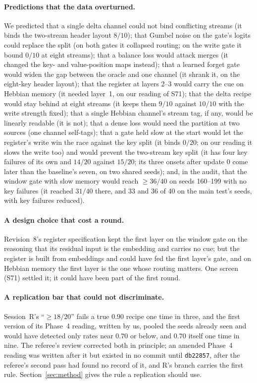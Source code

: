 \documentclass[11pt]{article}
\begin{document}
\paragraph{Predictions that the data overturned.} We predicted that a single delta channel could not bind conflicting streams (it binds the two-stream header layout $8/10$); that Gumbel noise on the gate's logits could replace the split (on both gates it collapsed routing; on the write gate it bound $0/10$ at eight streams); that a balance loss would attack merges (it changed the key- and value-position maps instead); that a learned forget gate would widen the gap between the oracle and one channel (it shrank it, on the eight-key header layout); that the register at layers 2--3 would carry the cue on Hebbian memory (it needed layer~1, on our reading of S71); that the delta recipe would stay behind at eight streams (it keeps them $9/10$ against $10/10$ with the write strength fixed); that a single Hebbian channel's stream tag, if any, would be linearly readable (it is not); that a dense loss would need the partition at two sources (one channel self-tags); that a gate held slow at the start would let the register's write win the race against the key split (it binds $0/20$; on our reading it slows the write too) and would prevent the two-stream key split (it has four key failures of its own and $14/20$ against $15/20$; its three onsets after update 0 come later than the baseline's seven, on two shared seeds); and, in the audit, that the window gate with slow memory would reach $\geq 36/40$ on seeds 160--199 with no key failures (it reached $31/40$ there, and $33$ and $36$ of 40 on the main test's seeds, with key failures reduced).

\paragraph{A design choice that cost a round.} Revision~8's register specification kept the first layer on the window gate on the reasoning that its residual input is the embedding and carries no cue; but the register is built from embeddings and could have fed the first layer's gate, and on Hebbian memory the first layer is the one whose routing matters. One screen (S71) settled it; it could have been part of the first round.

\paragraph{A replication bar that could not discriminate.} Session~R's ``$\geq 18/20$'' fails a true $0.90$ recipe one time in three, and the first version of its Phase~4 reading, written by us, pooled the seeds already seen and would have detected only rates near $0.70$ or below, and $0.70$ itself one time in nine. The referee's review corrected both in principle; an amended Phase~4 reading was written after it but existed in no commit until \texttt{db22857}, after the referee's second pass had found no record of it, and R's branch carries the first rule. Section~\ref{sec:method} gives the rule a replication should use.
\end{document}
